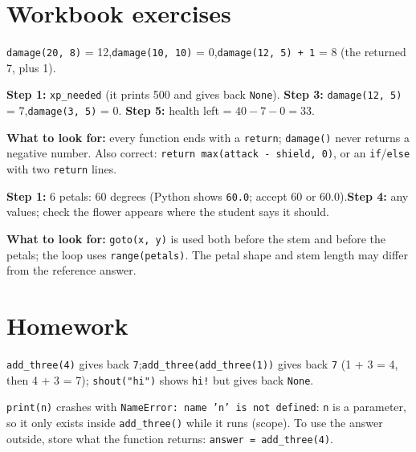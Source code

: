 
\section{Workbook exercises}
\begin{answer}
\texttt{damage(20, 8)} = 12,\quad \texttt{damage(10, 10)} = 0,\quad \texttt{damage(12, 5) + 1} = 8 (the returned 7, plus 1).
\end{answer}

\begin{answer}
\textbf{Step 1:} \texttt{xp\_needed} (it prints 500 and gives back \texttt{None}).\quad
\textbf{Step 3:} \texttt{damage(12, 5)} = 7,\quad \texttt{damage(3, 5)} = 0.\quad
\textbf{Step 5:} health left = $40 - 7 - 0 = 33$.\par
\textbf{What to look for:} every function ends with a \texttt{return}; \texttt{damage()} never returns a negative number.
Also correct: \texttt{return max(attack - shield, 0)}, or an \texttt{if}/\texttt{else} with two \texttt{return} lines.
\end{answer}

\begin{answer}
\textbf{Step 1:} 6 petals: 60 degrees (Python shows \texttt{60.0}; accept 60 or 60.0).\quad \textbf{Step 4:} any values; check the flower appears where the student says it should.\par
\textbf{What to look for:} \texttt{goto(x, y)} is used both before the stem and before the petals; the loop uses
\texttt{range(petals)}. The petal shape and stem length may differ from the reference answer.
\end{answer}

\section{Homework}
\begin{answer}
\texttt{add\_three(4)} gives back \texttt{7};\quad \texttt{add\_three(add\_three(1))} gives back \texttt{7} (1 + 3 = 4, then 4 + 3 = 7);\quad
\texttt{shout("hi")} shows \texttt{hi!} but gives back \texttt{None}.\par
\texttt{print(n)} crashes with \texttt{NameError: name 'n' is not defined}: \texttt{n} is a parameter, so it only exists inside
\texttt{add\_three()} while it runs (scope). To use the answer outside, store what the function returns: \texttt{answer = add\_three(4)}.
\end{answer}

